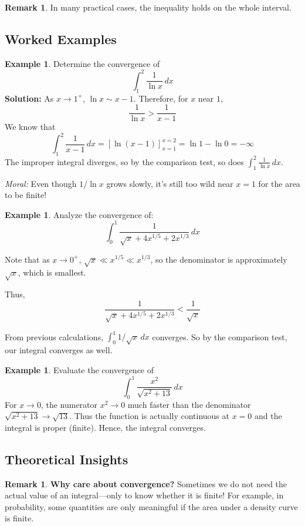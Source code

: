 \documentclass[11pt,oneside]{article}
\theoremstyle{definition}
\newtheorem{example}[theorem]{Example}
\newtheorem{remark}[theorem]{Remark}
\theoremstyle{remark}
\begin{document}
\begin{remark}
In many practical cases, the inequality holds on the whole interval.
\end{remark}

\subsection{Worked Examples}

\begin{example}
Determine the convergence of
\[
\int_1^2 \frac{1}{\ln x}\,dx
\]
\textbf{Solution:} As $x \to 1^+$, $\ln x \sim x-1$. Therefore, for $x$ near $1$,
\[
\frac{1}{\ln x} > \frac{1}{x-1}
\]
We know that
\[
\int_1^2 \frac{1}{x-1}\,dx = \left[ \ln(x-1) \right]_{x=1}^{x=2} = \ln 1 - \ln 0 = -\infty
\]
The improper integral diverges, so by the comparison test, so does $\int_1^2 \frac{1}{\ln x}\,dx$.

\emph{Moral:} Even though $1/\ln x$ grows slowly, it's still too wild near $x=1$ for the area to be finite!
\end{example}

\begin{example}
Analyze the convergence of:
\[
\int_0^1 \frac{1}{\sqrt{x} + 4x^{1/5} + 2x^{1/3}}\,dx
\]

Note that as $x \to 0^+$, $\sqrt{x} \ll x^{1/5} \ll x^{1/3}$, so the denominator is approximately $\sqrt{x}$, which is smallest.

Thus,
\[
\frac{1}{\sqrt{x} + 4x^{1/5} + 2x^{1/3}} < \frac{1}{\sqrt{x}}
\]

From previous calculations, $\int_0^1 1/\sqrt{x}\,dx$ converges. So by the comparison test, our integral converges as well.
\end{example}

\begin{example}
Evaluate the convergence of
\[
\int_0^1 \frac{x^2}{\sqrt{x^2 + 13}}\,dx
\]
For $x \to 0$, the numerator $x^2 \to 0$ much faster than the denominator $\sqrt{x^2 + 13} \to \sqrt{13}$. Thus the function is actually continuous at $x=0$ and the integral is proper (finite). Hence, the integral converges.
\end{example}

\subsection{Theoretical Insights}

\begin{remark}
\textbf{Why care about convergence?} Sometimes we do not need the actual value of an integral---only to know whether it is finite! For example, in probability, some quantities are only meaningful if the area under a density curve is finite.
\end{remark}
\end{document}
